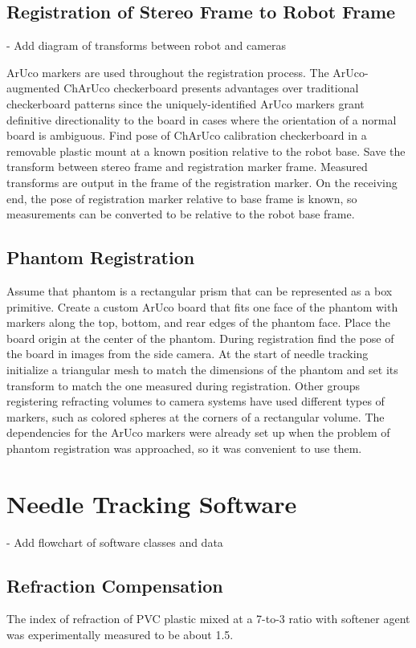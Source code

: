 \subsection{Registration of Stereo Frame to Robot Frame}
- Add diagram of transforms between robot and cameras

	ArUco markers are used throughout the registration process. The ArUco-augmented ChArUco checkerboard presents advantages over traditional checkerboard patterns since the uniquely-identified ArUco markers grant definitive directionality to the board in cases where the orientation of a normal board is ambiguous.
	Find pose of ChArUco calibration checkerboard in a removable plastic mount at a known position relative to the robot base. Save the transform between stereo frame and registration marker frame. Measured transforms are output in the frame of the registration marker. On the receiving end, the pose of registration marker relative to base frame is known, so measurements can be converted to be relative to the robot base frame.
    
\subsection{Phantom Registration}
	Assume that phantom is a rectangular prism that can be represented as a box primitive. Create a custom ArUco board that fits one face of the phantom with markers along the top, bottom, and rear edges of the phantom face. Place the board origin at the center of the phantom. During registration find the pose of the board in images from the side camera. At the start of needle tracking initialize a triangular mesh to match the dimensions of the phantom and set its transform to match the one measured during registration.
	Other groups registering refracting volumes to camera systems have used different types of markers, such as colored spheres at the corners of a rectangular volume. The dependencies for the ArUco markers were already set up when the problem of phantom registration was approached, so it was convenient to use them.

\section{Needle Tracking Software}
- Add flowchart of software classes and data

\subsection{Refraction Compensation}
The index of refraction of PVC plastic mixed at a 7-to-3 ratio with softener agent was experimentally measured to be about 1.5.


